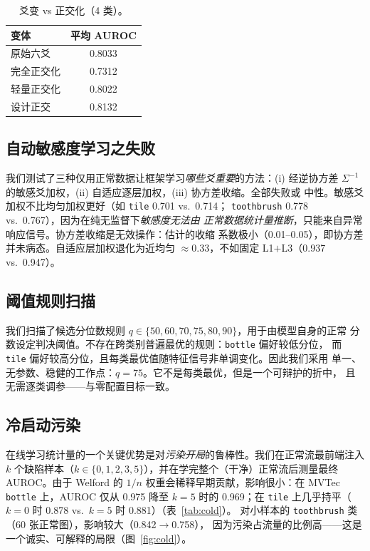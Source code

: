 \documentclass[journal,10pt]{IEEEtran}
\begin{document}
\begin{table}[t]
\centering
\caption{爻变 vs 正交化（4 类）。}
\label{tab:ortho}
\begin{tabular}{lc}
\toprule
变体 & 平均 AUROC \\
\midrule
原始六爻         & 0.8033 \\
完全正交化       & 0.7312 \\
轻量正交化       & 0.8022 \\
设计正交         & 0.8132 \\
\bottomrule
\end{tabular}
\end{table}

\subsection{自动敏感度学习之失败}
我们测试了三种仅用正常数据让框架学习\emph{哪些爻重要}的方法：(i) 经逆协方差
$\Sigma^{-1}$ 的敏感爻加权，(ii) 自适应逐层加权，(iii) 协方差收缩。全部失败或
中性。敏感爻加权不比均匀加权更好（如 \texttt{tile} 0.701 vs.\ 0.714；
\texttt{toothbrush} 0.778 vs.\ 0.767），因为在纯无监督下\emph{敏感度无法由
正常数据统计量推断}，只能来自异常响应信号。协方差收缩是无效操作：估计的收缩
系数极小（0.01--0.05），即协方差并未病态。自适应层加权退化为近均匀
$\approx0.33$，不如固定 L1$+$L3（0.937 vs.\ 0.947）。

\subsection{阈值规则扫描}
我们扫描了候选分位数规则 $q\in\{50,60,70,75,80,90\}$，用于由模型自身的正常
分数设定判决阈值。不存在跨类别普遍最优的规则：\texttt{bottle} 偏好较低分位，
而 \texttt{tile} 偏好较高分位，且每类最优值随特征信号非单调变化。因此我们采用
单一、无参数、稳健的工作点：$q{=}75$。它不是每类最优，但是一个可辩护的折中，
且无需逐类调参——与零配置目标一致。

\subsection{冷启动污染}
在线学习统计量的一个关键优势是对\emph{污染开局}的鲁棒性。我们在正常流最前端注入
$k$ 个缺陷样本（$k\in\{0,1,2,3,5\}$），并在学完整个（干净）正常流后测量最终
AUROC。由于 Welford 的 $1/n$ 权重会稀释早期贡献，影响很小：在 MVTec
\texttt{bottle} 上，AUROC 仅从 0.975 降至 $k{=}5$ 时的 0.969；在 \texttt{tile}
上几乎持平（$k{=}0$ 时 0.878 vs.\ $k{=}5$ 时 0.881）（表~\ref{tab:cold}）。
对小样本的 \texttt{toothbrush} 类（60 张正常图），影响较大（0.842$\to$0.758），
因为污染占流量的比例高——这是一个诚实、可解释的局限（图~\ref{fig:cold}）。
\end{document}
